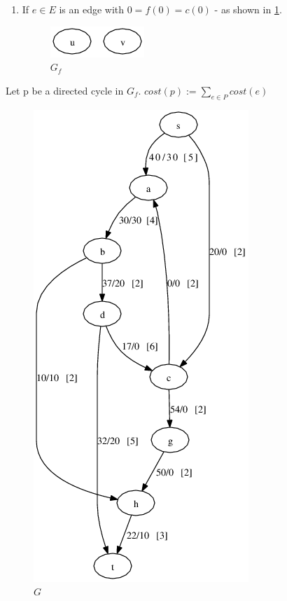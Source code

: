 \begin{enumerate}[label=\alph*]
\item 
If $e \in E$ is an edge with $0 = f(0) = c(0)$ - as shown in \ref{fig:G9}.
\begin{figure}[h]
\includegraphics[scale=0.45]{diagrams/graph5_7}
\caption{$G{_f}$}
\label{fig:G9}
\end{figure}
\end{enumerate}

\begin{definition}
Let p be a directed cycle in $G{_f}$.
$cost (p) := \sum\limits_{e \in P} cost(e)$
\end{definition}

\begin{example}

\begin{figure}[h]
\includegraphics[scale=0.45]{diagrams/graph5_8}
\caption{$G$}
\label{fig:G10}
\end{figure}


\end{example}
